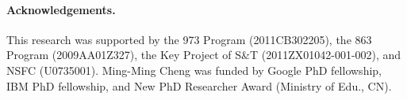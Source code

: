 \documentclass[final]{cvpr}
\newcommand{\vnudge}{\vspace*{-.1in}}
\begin{document}

\vnudge
\paragraph{Acknowledgements.} This research was supported by the
973 Program (2011CB302205), the 863 Program (2009AA01Z327), the Key Project of
S\&T (2011ZX01042-001-002), and NSFC (U0735001).
Ming-Ming Cheng was funded by Google PhD fellowship, IBM PhD fellowship,
and New PhD Researcher Award (Ministry of Edu., CN).

{\small


}
\end{document}
